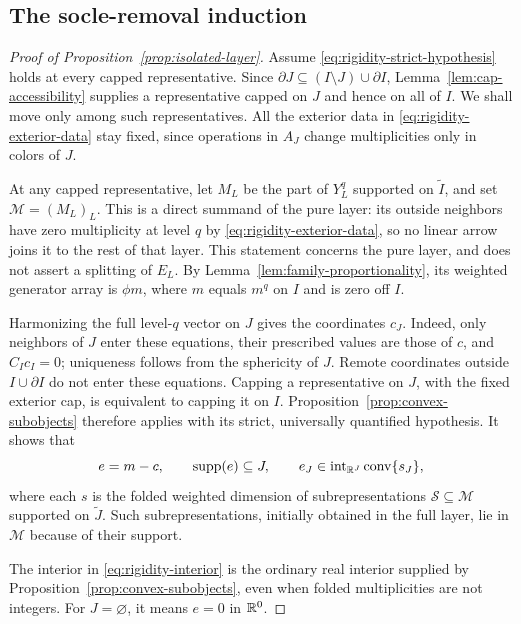 \subsection{The socle-removal induction}

\begin{proof}[Proof of Proposition~\ref{prop:isolated-layer}]
Assume \eqref{eq:rigidity-strict-hypothesis} holds at every capped
representative.  Since
$\partial J\subseteq(I\setminus J)\cup\partial I$,
Lemma~\ref{lem:cap-accessibility} supplies a representative capped on $J$
and hence on all of $I$.  We shall move only among such representatives.
All the exterior data in \eqref{eq:rigidity-exterior-data} stay fixed,
since operations in $A_J$ change multiplicities only in colors of $J$.

At any capped representative, let $M_L$ be the part of $Y_L^q$ supported
on $\widetilde I$, and set $\mathcal M=(M_L)_L$.  This is a direct
summand of the pure layer: its outside neighbors have zero multiplicity
at level $q$ by \eqref{eq:rigidity-exterior-data}, so no linear arrow
joins it to the rest of that layer.  This statement concerns the pure
layer, and does not assert a splitting of $E_L$.  By
Lemma~\ref{lem:family-proportionality}, its weighted generator array is
$\phi m$, where $m$ equals $m^q$ on $I$ and is zero off $I$.

Harmonizing the full level-$q$ vector on $J$ gives the coordinates $c_J$.
Indeed, only neighbors of $J$ enter these equations, their prescribed
values are those of $c$, and $C_Ic_I=0$; uniqueness follows from the
sphericity of $J$.  Remote coordinates outside $I\cup\partial I$ do not
enter these equations.  Capping a representative on $J$, with the fixed
exterior cap, is equivalent to capping it on $I$.
Proposition~\ref{prop:convex-subobjects} therefore applies with its strict,
universally quantified hypothesis.  It shows that
\begin{equation}
 e=m-c,\qquad \operatorname{supp}(e)\subseteq J,
 \qquad
 e_J\in\operatorname{int}_{\mathbb R^J}
 \operatorname{conv}\{s_J\},
 \label{eq:rigidity-interior}
\end{equation}
where each $s$ is the folded weighted dimension of subrepresentations
$\mathcal S\subseteq\mathcal M$ supported on $\widetilde J$.
Such subrepresentations, initially obtained in the full layer, lie in
$\mathcal M$ because of their support.

The interior in \eqref{eq:rigidity-interior} is the ordinary real
interior supplied by Proposition~\ref{prop:convex-subobjects}, even when
folded multiplicities are not integers.  For $J=\varnothing$, it means
$e=0$ in $\mathbb R^0$.


\end{proof}

